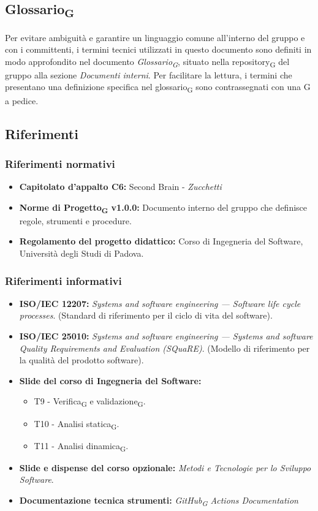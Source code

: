 \documentclass[11pt,a4paper]{article}
\newcommand{\gls}[1]{#1\textsubscript{G}}
\begin{document}
\subsection{\gls{Glossario}}
Per evitare ambiguità e garantire un linguaggio comune all'interno del gruppo e con i committenti, i termini tecnici utilizzati in questo documento sono definiti in modo approfondito nel documento \textit{\gls{Glossario}}, situato nella \gls{repository} del gruppo alla sezione \textit{Documenti interni}. Per facilitare la lettura, i termini che presentano una definizione specifica nel \gls{glossario} sono contrassegnati con una G a pedice.

\subsection{Riferimenti}
\subsubsection{Riferimenti normativi}
\begin{itemize}
    \item \textbf{Capitolato d'appalto C6:} Second Brain - \textit{Zucchetti}
    \item \textbf{\gls{Norme di Progetto} v1.0.0:} Documento interno del gruppo che definisce regole, strumenti e procedure.
    \item \textbf{Regolamento del progetto didattico:} Corso di Ingegneria del Software, Università degli Studi di Padova.
\end{itemize}

\subsubsection{Riferimenti informativi}
\begin{itemize}
    \item \textbf{ISO/IEC 12207:} \textit{Systems and software engineering — Software life cycle processes}. (Standard di riferimento per il ciclo di vita del software).
    \item \textbf{ISO/IEC 25010:} \textit{Systems and software engineering — Systems and software Quality Requirements and Evaluation (SQuaRE)}. (Modello di riferimento per la qualità del prodotto software).
    \item \textbf{Slide del corso di Ingegneria del Software:}
    \begin{itemize}
        \item T9 - \gls{Verifica} e \gls{validazione}.
        \item T10 - \gls{Analisi statica}.
        \item T11 - \gls{Analisi dinamica}.
    \end{itemize}
    \item \textbf{Slide e dispense del corso opzionale:} \textit{Metodi e Tecnologie per lo Sviluppo Software}.
    \item \textbf{Documentazione tecnica strumenti:} \textit{\gls{GitHub} Actions Documentation}
\end{itemize}
\end{document}
